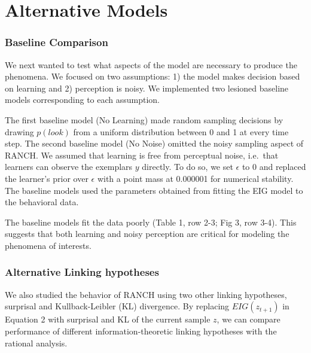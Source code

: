 \documentclass[10pt, letterpaper]{article}
\begin{document}
\hypertarget{alternative-models}{%
\section{Alternative Models}\label{alternative-models}}

\hypertarget{baseline-comparison}{%
\subsubsection{Baseline Comparison}\label{baseline-comparison}}

We next wanted to test what aspects of the model are necessary to
produce the phenomena. We focused on two assumptions: 1) the model makes
decision based on learning and 2) perception is noisy. We implemented
two lesioned baseline models corresponding to each assumption.

The first baseline model (No Learning) made random sampling decisions by
drawing \(p(look)\) from a uniform distribution between 0 and 1 at every
time step. The second baseline model (No Noise) omitted the noisy
sampling aspect of RANCH. We assumed that learning is free from
perceptual noise, i.e.~that learners can observe the exemplars \(y\)
directly. To do so, we set \(\epsilon\) to 0 and replaced the learner's
prior over \(\epsilon\) with a point mass at 0.000001 for numerical
stability. The baseline models used the parameters obtained from fitting
the EIG model to the behavioral data.

The baseline models fit the data poorly (Table 1, row 2-3; Fig 3, row
3-4). This suggests that both learning and noisy perception are critical
for modeling the phenomena of interests.

\hypertarget{alternative-linking-hypotheses}{%
\subsubsection{Alternative Linking
hypotheses}\label{alternative-linking-hypotheses}}

We also studied the behavior of RANCH using two other linking
hypotheses, surprisal and Kullback-Leibler (KL) divergence. By replacing
\(EIG(z_{t+1})\) in Equation 2 with surprisal and KL of the current
sample \(z\), we can compare performance of different
information-theoretic linking hypotheses with the rational analysis.
\end{document}
